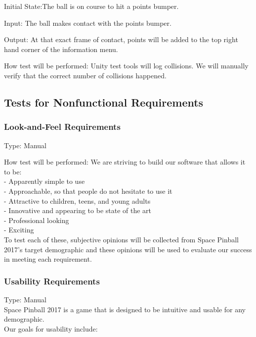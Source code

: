 \documentclass[12pt, titlepage]{article}
\begin{document}
Initial State:The ball is on course to hit a points bumper.
				
Input: The ball makes contact with the points bumper.

Output: At that exact frame of contact, points will be added to the top right hand corner of the information menu.
					
How test will be performed: Unity test tools will log collisions. We will manually verify that the correct number of collisions happened.\\

\subsection{Tests for Nonfunctional Requirements}

\subsubsection{Look-and-Feel Requirements}

Type: Manual
						
How test will be performed: We are striving to build our software that allows it to be: \\

- Apparently simple to use\\
- Approachable, so that people do not hesitate to use it\\
- Attractive to children, teens, and young adults\\
- Innovative and appearing to be state of the art\\
- Professional looking\\
- Exciting\\

To test each of these, subjective opinions will be collected from Space Pinball 2017's target demographic and these opinions will be used to evaluate our success in meeting each requirement.
					

\subsubsection{Usability Requirements}


Type: Manual\\
	
Space Pinball 2017 is a game that is designed to be intuitive and usable for any demographic.\\

Our goals for usability include:\\
\end{document}
